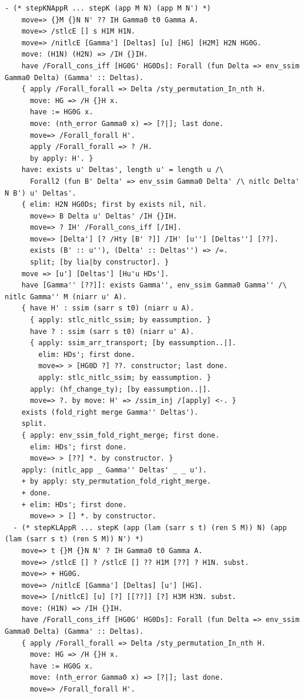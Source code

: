 \begin{lstlisting}[style=authorcoq]
  - (* stepKNAppR ... stepK (app M N) (app M N') *)
    move=> {}M {}N N' ?? IH Gamma0 t0 Gamma A.
    move=> /stlcE [] s H1M H1N.
    move=> /nitlcE [Gamma'] [Deltas] [u] [HG] [H2M] H2N HG0G.
    move: (H1N) (H2N) => /IH {}IH.
    have /Forall_cons_iff [HG0G' HG0Ds]: Forall (fun Delta => env_ssim Gamma0 Delta) (Gamma' :: Deltas).
    { apply /Forall_forall => Delta /sty_permutation_In_nth H.
      move: HG => /H {}H x.
      have := HG0G x.
      move: (nth_error Gamma0 x) => [?|]; last done.
      move=> /Forall_forall H'.
      apply /Forall_forall => ? /H.
      by apply: H'. }
    have: exists u' Deltas', length u' = length u /\
      Forall2 (fun B' Delta' => env_ssim Gamma0 Delta' /\ nitlc Delta' N B') u' Deltas'.
    { elim: H2N HG0Ds; first by exists nil, nil.
      move=> B Delta u' Deltas' /IH {}IH.
      move=> ? IH' /Forall_cons_iff [/IH].
      move=> [Delta'] [? /Hty [B' ?]] /IH' [u''] [Deltas''] [??].
      exists (B' :: u''), (Delta' :: Deltas'') => /=.
      split; [by lia|by constructor]. }
    move => [u'] [Deltas'] [Hu'u HDs'].
    have [Gamma'' [??]]: exists Gamma'', env_ssim Gamma0 Gamma'' /\ nitlc Gamma'' M (niarr u' A).
    { have H' : ssim (sarr s t0) (niarr u A).
      { apply: stlc_nitlc_ssim; by eassumption. }
      have ? : ssim (sarr s t0) (niarr u' A).
      { apply: ssim_arr_transport; [by eassumption..|].
        elim: HDs'; first done.
        move=> > [HG0D ?] ??. constructor; last done.
        apply: stlc_nitlc_ssim; by eassumption. }
      apply: (hf_change_ty); [by eassumption..|].
      move=> ?. by move: H' => /ssim_inj /[apply] <-. }
    exists (fold_right merge Gamma'' Deltas').
    split.
    { apply: env_ssim_fold_right_merge; first done.
      elim: HDs'; first done.
      move=> > [??] *. by constructor. }
    apply: (nitlc_app _ Gamma'' Deltas' _ _ u').
    + by apply: sty_permutation_fold_right_merge.
    + done.
    + elim: HDs'; first done.
      move=> > [] *. by constructor.
  - (* stepKLAppR ... stepK (app (lam (sarr s t) (ren S M)) N) (app (lam (sarr s t) (ren S M)) N') *)
    move=> t {}M {}N N' ? IH Gamma0 t0 Gamma A.
    move=> /stlcE [] ? /stlcE [] ?? H1M [??] ? H1N. subst.
    move=> + HG0G.
    move=> /nitlcE [Gamma'] [Deltas] [u'] [HG].
    move=> [/nitlcE] [u] [?] [[??]] [?] H3M H3N. subst.
    move: (H1N) => /IH {}IH.
    have /Forall_cons_iff [HG0G' HG0Ds]: Forall (fun Delta => env_ssim Gamma0 Delta) (Gamma' :: Deltas).
    { apply /Forall_forall => Delta /sty_permutation_In_nth H.
      move: HG => /H {}H x.
      have := HG0G x.
      move: (nth_error Gamma0 x) => [?|]; last done.
      move=> /Forall_forall H'.

\end{lstlisting}

